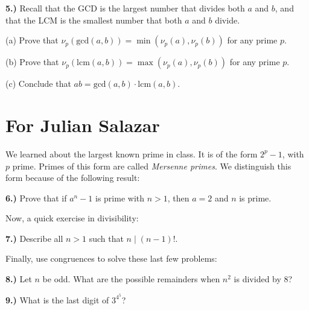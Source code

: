 \documentclass[10pt]{amsart}
\begin{document}
\medskip

{\bf 5.)} Recall that the GCD is the largest number that divides both $a$ and $b$, and that the LCM is the smallest number that both $a$ and $b$ divide.

\smallskip

{(a)} Prove that $\nu_p (\text{gcd}(a,b)) = \min(\nu_p (a), \nu_p (b))$ for any prime $p$.

\smallskip

{(b)} Prove that $\nu_p (\text{lcm}(a,b)) = \max(\nu_p (a), \nu_p (b))$ for any prime $p$.

\smallskip

{(c)} Conclude that $ab = \text{gcd}(a,b) \cdot \text{lcm}(a,b)$.

\medskip

\section*{For Julian Salazar}

\noindent We learned about the largest known prime in class. It is of the form $2^p - 1$, with $p$ prime. Primes of this form are called \emph{Mersenne primes}. We distinguish this form because of the following result:

\medskip

{\bf 6.)} Prove that if $a^n - 1$ is prime with $n > 1$, then $a = 2$ and $n$ is prime.

\medskip

\noindent Now, a quick exercise in divisibility:

\medskip

{\bf 7.)} Describe all $n > 1$ such that $n \mid (n-1)$!.

\medskip

\noindent Finally, use congruences to solve these last few problems:

\medskip

{\bf 8.)} Let $n$ be odd. What are the possible remainders when $n^2$ is divided by 8?

\medskip

{\bf 9.)} What is the last digit of $3^{4^5}$?
\end{document}
